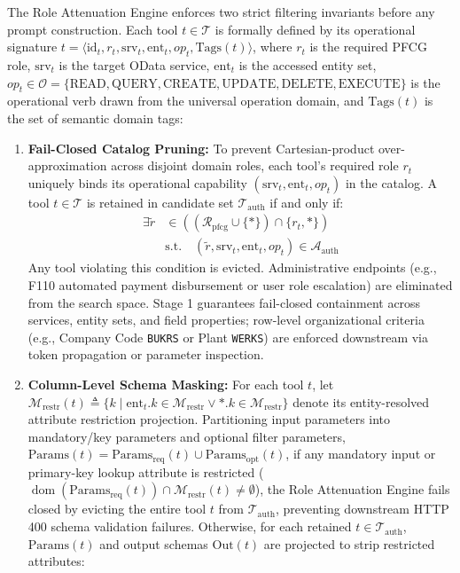 \documentclass[conference,10pt]{IEEEtran}
\begin{document}
The Role Attenuation Engine enforces two strict filtering invariants before any prompt construction. Each tool $t \in \mathcal{T}$ is formally defined by its operational signature $t = \langle \text{id}_t, r_t, \text{srv}_t, \text{ent}_t, op_t, \text{Tags}(t) \rangle$, where $r_t$ is the required PFCG role, $\text{srv}_t$ is the target OData service, $\text{ent}_t$ is the accessed entity set, $op_t \in \mathcal{O} = \{\text{READ}, \text{QUERY}, \text{CREATE}, \text{UPDATE}, \text{DELETE}, \text{EXECUTE}\}$ is the operational verb drawn from the universal operation domain, and $\text{Tags}(t)$ is the set of semantic domain tags:
\begin{enumerate}
    \item \textbf{Fail-Closed Catalog Pruning:} To prevent Cartesian-product over-approximation across disjoint domain roles, each tool's required role $r_t$ uniquely binds its operational capability $(\text{srv}_t, \text{ent}_t, op_t)$ in the catalog. A tool $t \in \mathcal{T}$ is retained in candidate set $\mathcal{T}_{\text{auth}}$ if and only if:
    \begin{equation}
    \begin{aligned}
    \exists \tilde{r} &\in ((\mathcal{R}_{\text{pfcg}} \cup \{*\}) \cap \{r_t, *\}) \\
    &\text{s.t.}\quad (\tilde{r}, \text{srv}_t, \text{ent}_t, op_t) \in \mathcal{A}_{\text{auth}}
    \end{aligned}
    \end{equation}
    Any tool violating this condition is evicted. Administrative endpoints (e.g., F110 automated payment disbursement or user role escalation) are eliminated from the search space. Stage 1 guarantees fail-closed containment across services, entity sets, and field properties; row-level organizational criteria (e.g., Company Code \texttt{BUKRS} or Plant \texttt{WERKS}) are enforced downstream via token propagation or parameter inspection.
    \item \textbf{Column-Level Schema Masking:} For each tool $t$, let $\mathcal{M}_{\text{restr}}(t) \triangleq \{k \mid \text{ent}_t.k \in \mathcal{M}_{\text{restr}} \lor \texttt{*.}k \in \mathcal{M}_{\text{restr}}\}$ denote its entity-resolved attribute restriction projection. Partitioning input parameters into mandatory/key parameters and optional filter parameters, $\text{Params}(t) = \text{Params}_{\text{req}}(t) \cup \text{Params}_{\text{opt}}(t)$, if any mandatory input or primary-key lookup attribute is restricted ($\operatorname{dom}(\text{Params}_{\text{req}}(t)) \cap \mathcal{M}_{\text{restr}}(t) \neq \emptyset$), the Role Attenuation Engine fails closed by evicting the entire tool $t$ from $\mathcal{T}_{\text{auth}}$, preventing downstream HTTP 400 schema validation failures. Otherwise, for each retained $t \in \mathcal{T}_{\text{auth}}$, $\text{Params}(t)$ and output schemas $\text{Out}(t)$ are projected to strip restricted attributes:

\end{enumerate}
\end{document}
